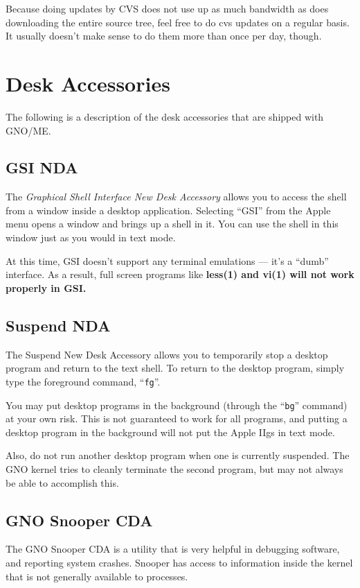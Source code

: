 \documentclass{report}
\begin{document}
Because doing updates by CVS does not use up as much bandwidth as 
does downloading the entire source tree, feel free to do cvs updates
on a regular basis.  It usually doesn't make sense to do them more
than once per day, though.

\chapter{Desk Accessories}

The following is a description of the desk
accessories that are shipped with GNO/ME.

\section{GSI NDA}

The \textit{Graphical Shell Interface New Desk Accessory}
allows you to access the shell from a window inside a
desktop application. Selecting ``GSI'' from the Apple menu opens a
window and brings up a shell in it. You can use the shell in this
window just as you would in text mode.

At this time, GSI doesn't support any
terminal emulations --- it's a ``dumb'' interface. As a result,
full screen programs like \bf less\rm(1) and \bf vi\rm(1) will not
work properly in GSI.

\section{Suspend NDA}

The Suspend New Desk Accessory allows you
to temporarily stop a desktop program and return to the text
shell. To return to the desktop program, simply type the foreground
command, ``\texttt{fg}''.

You may put desktop programs in the background
(through the ``\texttt{bg}'' command) 
at your own risk. This is not guaranteed to work for all programs,
and putting a desktop program in the background will not put the
Apple IIgs in text mode.

Also, do not run another desktop program
when one is currently suspended. The GNO kernel tries to cleanly
terminate the second program, but may not always be able to
accomplish this.

\section{GNO Snooper CDA}

The GNO Snooper CDA is a utility that is
very helpful in debugging software, and reporting system crashes.
Snooper has access to information inside the kernel that is not
generally available to processes.
\end{document}
